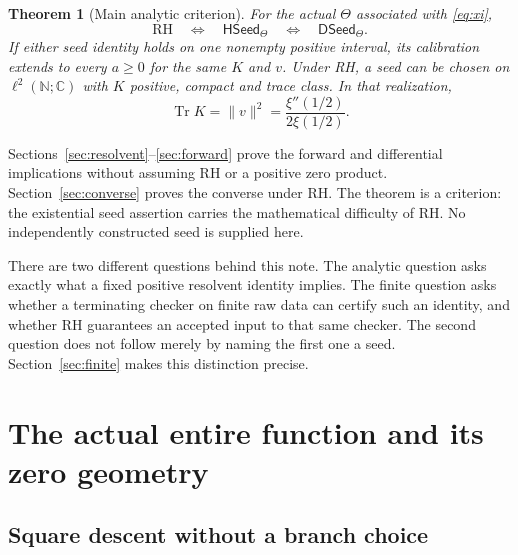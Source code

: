 \documentclass[11pt,a4paper]{article}
\numberwithin{equation}{section}
\newtheorem{theorem}{Theorem}[section]
\theoremstyle{definition}
\theoremstyle{remark}
\newcommand{\C}{\mathbb C}
\newcommand{\N}{\mathbb N}
\newcommand{\norm}[1]{\lVert #1\rVert}
\newcommand{\RH}{\mathrm{RH}}
\newcommand{\HSeed}{\mathsf{HSeed}_{\Theta}}
\newcommand{\DSeed}{\mathsf{DSeed}_{\Theta}}
\DeclareMathOperator{\Tr}{Tr}
\begin{document}
\begin{theorem}[Main analytic criterion]\label{thm:main}
For the actual $\Theta$ associated with \eqref{eq:xi},
\begin{equation}\label{eq:main}
\RH\quad\Longleftrightarrow\quad\HSeed
\quad\Longleftrightarrow\quad\DSeed.
\end{equation}
If either seed identity holds on one nonempty positive interval, its
calibration extends to every $a\geq0$ for the same $K$ and $v$.
Under RH, a seed can be chosen on $\ell^2(\N;\C)$ with $K$ positive,
compact and trace class. In that realization,
\begin{equation}\label{eq:normalization-intro}
\Tr K=\norm v^2=\frac{\xi''(1/2)}{2\xi(1/2)}.
\end{equation}
\end{theorem}

Sections~\ref{sec:resolvent}--\ref{sec:forward} prove the forward and
differential implications without assuming RH or a positive zero product.
Section~\ref{sec:converse} proves the converse under RH. The theorem is
a criterion: the existential seed assertion carries the mathematical
difficulty of RH. No independently constructed seed is supplied here.

There are two different questions behind this note. The analytic question
asks exactly what a fixed positive resolvent identity implies. The finite
question asks whether a terminating checker on finite raw data can certify
such an identity, and whether RH guarantees an accepted input to that same
checker. The second question does not follow merely by naming the first
one a seed. Section~\ref{sec:finite} makes this distinction precise.

\section[Entire function and zero geometry]{The actual entire function and its zero geometry}\label{sec:theta}

\subsection{Square descent without a branch choice}
\end{document}
